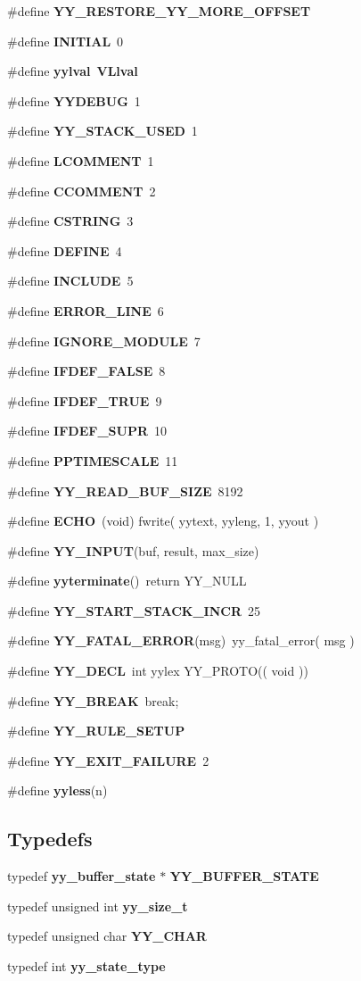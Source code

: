 \begin{CompactItemize}
\item 
\#define {\bf YY\_\-RESTORE\_\-YY\_\-MORE\_\-OFFSET}
\item 
\#define {\bf INITIAL}\ 0
\item 
\#define {\bf yylval}\ {\bf VLlval}
\item 
\#define {\bf YYDEBUG}\ 1
\item 
\#define {\bf YY\_\-STACK\_\-USED}\ 1
\item 
\#define {\bf LCOMMENT}\ 1
\item 
\#define {\bf CCOMMENT}\ 2
\item 
\#define {\bf CSTRING}\ 3
\item 
\#define {\bf DEFINE}\ 4
\item 
\#define {\bf INCLUDE}\ 5
\item 
\#define {\bf ERROR\_\-LINE}\ 6
\item 
\#define {\bf IGNORE\_\-MODULE}\ 7
\item 
\#define {\bf IFDEF\_\-FALSE}\ 8
\item 
\#define {\bf IFDEF\_\-TRUE}\ 9
\item 
\#define {\bf IFDEF\_\-SUPR}\ 10
\item 
\#define {\bf PPTIMESCALE}\ 11
\item 
\#define {\bf YY\_\-READ\_\-BUF\_\-SIZE}\ 8192
\item 
\#define {\bf ECHO}\ (void) fwrite( yytext, yyleng, 1, yyout )
\item 
\#define {\bf YY\_\-INPUT}(buf, result, max\_\-size)
\item 
\#define {\bf yyterminate}()\ return YY\_\-NULL
\item 
\#define {\bf YY\_\-START\_\-STACK\_\-INCR}\ 25
\item 
\#define {\bf YY\_\-FATAL\_\-ERROR}(msg)\ yy\_\-fatal\_\-error( msg )
\item 
\#define {\bf YY\_\-DECL}\ int yylex YY\_\-PROTO(( void ))
\item 
\#define {\bf YY\_\-BREAK}\ break;
\item 
\#define {\bf YY\_\-RULE\_\-SETUP}
\item 
\#define {\bf YY\_\-EXIT\_\-FAILURE}\ 2
\item 
\#define {\bf yyless}(n)
\end{CompactItemize}
\subsection*{Typedefs}
\begin{CompactItemize}
\item 
typedef {\bf yy\_\-buffer\_\-state} $\ast$ {\bf YY\_\-BUFFER\_\-STATE}
\item 
typedef unsigned int {\bf yy\_\-size\_\-t}
\item 
typedef unsigned char {\bf YY\_\-CHAR}
\item 
typedef int {\bf yy\_\-state\_\-type}
\end{CompactItemize}
